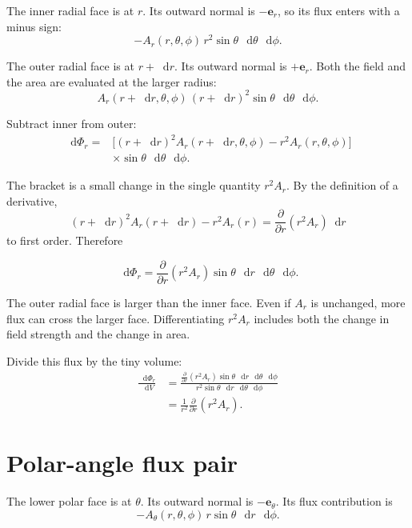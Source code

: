 \documentclass[11pt,a4paper]{article}
\newcommand{\er}{\bm e_r}
\newcommand{\etheta}{\bm e_\theta}
\newcommand{\dd}{\mathop{}\!\mathrm d}
\begin{document}
The inner radial face is at \(r\). Its outward normal is \(-\er\), so its flux enters with a minus sign:
\[
  -A_r(r,\theta,\phi)\,
  r^2\sin\theta\,\dd\theta\,\dd\phi.
\]

The outer radial face is at \(r+\dd r\). Its outward normal is \(+\er\). Both the field and the area are evaluated at the larger radius:
\[
  A_r(r+\dd r,\theta,\phi)\,
  (r+\dd r)^2\sin\theta\,\dd\theta\,\dd\phi.
\]

Subtract inner from outer:
\begin{align*}
  \dd\Phi_r
  ={}&\Big[(r+\dd r)^2A_r(r+\dd r,\theta,\phi)
  -r^2A_r(r,\theta,\phi)\Big]\\
  &\times\sin\theta\,\dd\theta\,\dd\phi.
\end{align*}

The bracket is a small change in the single quantity \(r^2A_r\). By the definition of a derivative,
\[
  (r+\dd r)^2A_r(r+\dd r)-r^2A_r(r)
  =\frac{\partial}{\partial r}(r^2A_r)\dd r
\]
to first order. Therefore
\begin{result}
\[
  \boxed{
  \dd\Phi_r
  =\frac{\partial}{\partial r}(r^2A_r)
   \sin\theta\,\dd r\,\dd\theta\,\dd\phi.}
\]
\end{result}

\begin{notecheck}
The outer radial face is larger than the inner face. Even if \(A_r\) is unchanged, more flux can cross the larger face. Differentiating \(r^2A_r\) includes both the change in field strength and the change in area.
\end{notecheck}

Divide this flux by the tiny volume:
\begin{align*}
  \frac{\dd\Phi_r}{\dd V}
  &=
  \frac{
  \frac{\partial}{\partial r}(r^2A_r)
  \sin\theta\,\dd r\,\dd\theta\,\dd\phi
  }{
  r^2\sin\theta\,\dd r\,\dd\theta\,\dd\phi
  }\\
  &=\boxed{
  \frac{1}{r^2}\frac{\partial}{\partial r}(r^2A_r)}.
\end{align*}

\clearpage

\section{Polar-angle flux pair}

The lower polar face is at \(\theta\). Its outward normal is \(-\etheta\). Its flux contribution is
\[
  -A_\theta(r,\theta,\phi)\,
  r\sin\theta\,\dd r\,\dd\phi.
\]
\end{document}
